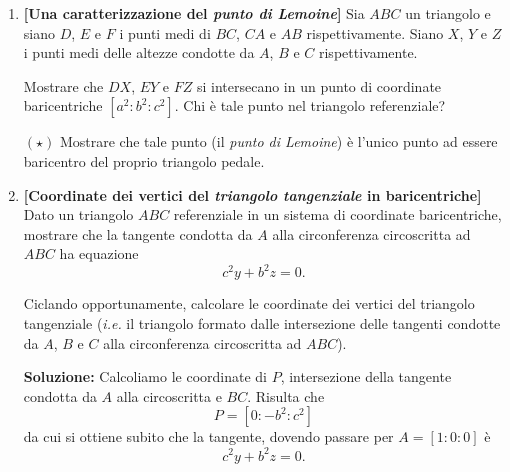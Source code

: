 \begin{enumerate}
	\item \textbf{[Una caratterizzazione del \textit{punto di Lemoine}]} Sia $ABC$ un triangolo e siano $D$, $E$ e $F$ i punti medi di $BC$, $CA$ e $AB$ rispettivamente. Siano $X$, $Y$ e $Z$ i punti medi delle altezze condotte da $A$, $B$ e $C$ rispettivamente. 
	
	Mostrare che $DX$, $EY$ e $FZ$ si intersecano in un punto di coordinate baricentriche $[a^2:b^2:c^2]$. Chi è tale punto nel triangolo referenziale?
	
	$(\star)$ Mostrare che tale punto (il \textit{punto di Lemoine}) è l'unico punto ad essere baricentro del proprio triangolo pedale.
	\item \textbf{[Coordinate dei vertici del \textit{triangolo tangenziale} in baricentriche]}  Dato un triangolo $ABC$ referenziale in un sistema di coordinate baricentriche, mostrare che la tangente condotta da $A$ alla circonferenza circoscritta ad $ABC$ ha equazione
	\begin{equation}
	c^2y+b^2z=0.
	\end{equation}
	
	Ciclando opportunamente, calcolare le coordinate dei vertici del triangolo tangenziale (\textit{i.e.} il triangolo formato dalle intersezione delle tangenti condotte da $A$, $B$ e $C$ alla circonferenza circoscritta ad $ABC$).
	
	\textbf{Soluzione:}
	Calcoliamo le coordinate di $P$, intersezione della tangente condotta da $A$ alla circoscritta e $BC$. Risulta che 
	$$
	P=[0:-b^2:c^2]
	$$
	da cui si ottiene subito che la tangente, dovendo passare per $A=[1:0:0]$ è
	$$
	c^2y+b^2z=0.
	$$
	

\end{enumerate}
